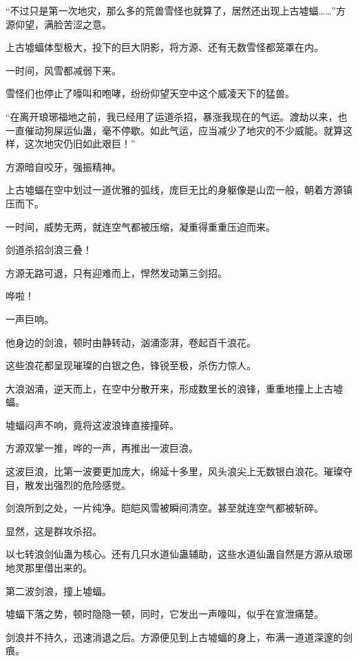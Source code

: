 
\begin{this_body}

“不过只是第一次地灾，那么多的荒兽雪怪也就算了，居然还出现上古墟蝠……”方源仰望，满脸苦涩之意。

上古墟蝠体型极大，投下的巨大阴影，将方源、还有无数雪怪都笼罩在内。

一时间，风雪都减弱下来。

雪怪们也停止了嚎叫和咆哮，纷纷仰望天空中这个威凌天下的猛兽。

“在离开琅琊福地之前，我已经用了运道杀招，暴涨我现在的气运。渡劫以来，也一直催动狗屎运仙蛊，毫不停歇。如此气运，应当减少了地灾的不少威能。就算这样，这次地灾仍旧如此艰巨！”

方源暗自咬牙，强振精神。

上古墟蝠在空中划过一道优雅的弧线，庞巨无比的身躯像是山峦一般，朝着方源镇压而下。

一时间，威势无两，就连空气都被压缩，凝重得重重压迫而来。

剑道杀招剑浪三叠！

方源无路可退，只有迎难而上，悍然发动第三剑招。

哗啦！

一声巨响。

他身边的剑浪，顿时由静转动，汹涌澎湃，卷起百千浪花。

这些浪花都呈现璀璨的白银之色，锋锐至极，杀伤力惊人。

大浪汹涌，逆天而上，在空中分散开来，形成数里长的浪锋，重重地撞上上古墟蝠。

墟蝠闷声不响，竟将这波浪锋直接撞碎。

方源双掌一推，哗的一声，再推出一波巨浪。

这波巨浪，比第一波要更加庞大，绵延十多里，风头浪尖上无数银白浪花。璀璨夺目，散发出强烈的危险感觉。

剑浪所到之处，一片纯净。皑皑风雪被瞬间清空。甚至就连空气都被斩碎。

显然，这是群攻杀招。

以七转浪剑仙蛊为核心。还有几只水道仙蛊辅助，这些水道仙蛊自然是方源从琅琊地灵那里借出来的。

第二波剑浪，撞上墟蝠。

墟蝠下落之势，顿时隐隐一顿，同时，它发出一声嚎叫，似乎在宣泄痛楚。

剑浪并不持久，迅速消退之后。方源便见到上古墟蝠的身上，布满一道道深邃的剑痕。


\end{this_body}
